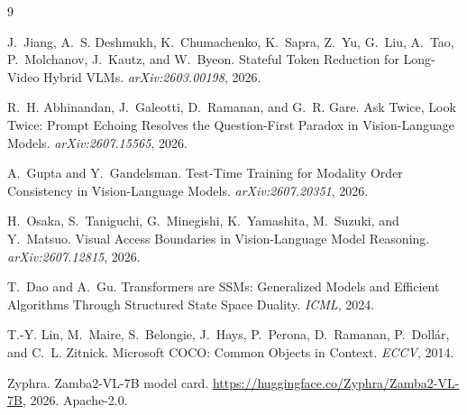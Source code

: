\documentclass[11pt]{article}
\begin{document}
\begin{thebibliography}{9}\small

J.~Jiang, A.~S. Deshmukh, K.~Chumachenko, K.~Sapra, Z.~Yu, G.~Liu, A.~Tao,
P.~Molchanov, J.~Kautz, and W.~Byeon.
\newblock Stateful Token Reduction for Long-Video Hybrid VLMs.
\newblock \emph{arXiv:2603.00198}, 2026.

R.~H. Abhinandan, J.~Galeotti, D.~Ramanan, and G.~R. Gare.
\newblock Ask Twice, Look Twice: Prompt Echoing Resolves the Question-First
Paradox in Vision-Language Models.
\newblock \emph{arXiv:2607.15565}, 2026.

A.~Gupta and Y.~Gandelsman.
\newblock Test-Time Training for Modality Order Consistency in Vision-Language
Models.
\newblock \emph{arXiv:2607.20351}, 2026.

H.~Osaka, S.~Taniguchi, G.~Minegishi, K.~Yamashita, M.~Suzuki, and Y.~Matsuo.
\newblock Visual Access Boundaries in Vision-Language Model Reasoning.
\newblock \emph{arXiv:2607.12815}, 2026.

T.~Dao and A.~Gu.
\newblock Transformers are SSMs: Generalized Models and Efficient Algorithms
Through Structured State Space Duality.
\newblock \emph{ICML}, 2024.

T.-Y. Lin, M.~Maire, S.~Belongie, J.~Hays, P.~Perona, D.~Ramanan,
P.~Doll\'ar, and C.~L. Zitnick.
\newblock Microsoft COCO: Common Objects in Context.
\newblock \emph{ECCV}, 2014.

Zyphra.
\newblock Zamba2-VL-7B model card.
\newblock \url{https://huggingface.co/Zyphra/Zamba2-VL-7B}, 2026.
Apache-2.0.

\end{thebibliography}
\end{document}
